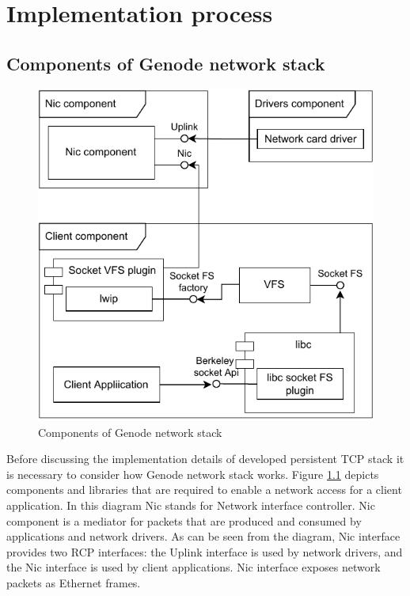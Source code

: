 \chapter{Implementation process}

\section{Components of Genode network stack}

\begin{figure}
    \centering
    \includegraphics[]{figs/genode-network-stack.pdf}
    \caption{Components of Genode network stack}
    \label{fig:net-components}
\end{figure}

Before discussing the implementation details of developed persistent TCP stack
it is necessary to consider how Genode network stack works. Figure
\ref{fig:net-components} depicts components and libraries that are required to
enable a network access for a client application. In this diagram Nic stands
for Network interface controller. Nic component is a mediator for packets that
are produced and consumed by applications and network drivers. As can be seen
from the diagram, Nic interface provides two RCP interfaces: the Uplink
interface is used by network drivers, and the Nic interface is used by client
applications. Nic interface exposes network packets as Ethernet frames.


